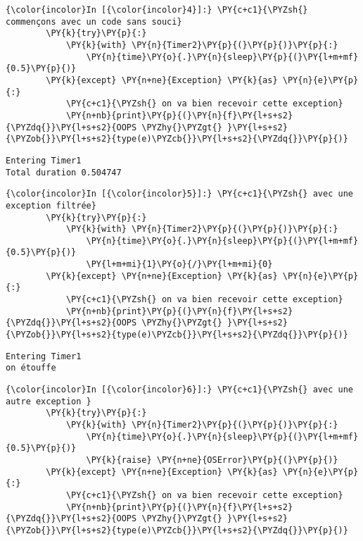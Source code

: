     \begin{Verbatim}[commandchars=\\\{\}]
{\color{incolor}In [{\color{incolor}4}]:} \PY{c+c1}{\PYZsh{} commençons avec un code sans souci}
        \PY{k}{try}\PY{p}{:}
            \PY{k}{with} \PY{n}{Timer2}\PY{p}{(}\PY{p}{)}\PY{p}{:}
                \PY{n}{time}\PY{o}{.}\PY{n}{sleep}\PY{p}{(}\PY{l+m+mf}{0.5}\PY{p}{)}
        \PY{k}{except} \PY{n+ne}{Exception} \PY{k}{as} \PY{n}{e}\PY{p}{:}
            \PY{c+c1}{\PYZsh{} on va bien recevoir cette exception}
            \PY{n+nb}{print}\PY{p}{(}\PY{n}{f}\PY{l+s+s2}{\PYZdq{}}\PY{l+s+s2}{OOPS \PYZhy{}\PYZgt{} }\PY{l+s+s2}{\PYZob{}}\PY{l+s+s2}{type(e)\PYZcb{}}\PY{l+s+s2}{\PYZdq{}}\PY{p}{)}
\end{Verbatim}


    \begin{Verbatim}[commandchars=\\\{\}]
Entering Timer1
Total duration 0.504747

    \end{Verbatim}

    \begin{Verbatim}[commandchars=\\\{\}]
{\color{incolor}In [{\color{incolor}5}]:} \PY{c+c1}{\PYZsh{} avec une exception filtrée}
        \PY{k}{try}\PY{p}{:}
            \PY{k}{with} \PY{n}{Timer2}\PY{p}{(}\PY{p}{)}\PY{p}{:}
                \PY{n}{time}\PY{o}{.}\PY{n}{sleep}\PY{p}{(}\PY{l+m+mf}{0.5}\PY{p}{)}
                \PY{l+m+mi}{1}\PY{o}{/}\PY{l+m+mi}{0}
        \PY{k}{except} \PY{n+ne}{Exception} \PY{k}{as} \PY{n}{e}\PY{p}{:}
            \PY{c+c1}{\PYZsh{} on va bien recevoir cette exception}
            \PY{n+nb}{print}\PY{p}{(}\PY{n}{f}\PY{l+s+s2}{\PYZdq{}}\PY{l+s+s2}{OOPS \PYZhy{}\PYZgt{} }\PY{l+s+s2}{\PYZob{}}\PY{l+s+s2}{type(e)\PYZcb{}}\PY{l+s+s2}{\PYZdq{}}\PY{p}{)}
\end{Verbatim}


    \begin{Verbatim}[commandchars=\\\{\}]
Entering Timer1
on étouffe

    \end{Verbatim}

    \begin{Verbatim}[commandchars=\\\{\}]
{\color{incolor}In [{\color{incolor}6}]:} \PY{c+c1}{\PYZsh{} avec une autre exception }
        \PY{k}{try}\PY{p}{:}
            \PY{k}{with} \PY{n}{Timer2}\PY{p}{(}\PY{p}{)}\PY{p}{:}
                \PY{n}{time}\PY{o}{.}\PY{n}{sleep}\PY{p}{(}\PY{l+m+mf}{0.5}\PY{p}{)}
                \PY{k}{raise} \PY{n+ne}{OSError}\PY{p}{(}\PY{p}{)}
        \PY{k}{except} \PY{n+ne}{Exception} \PY{k}{as} \PY{n}{e}\PY{p}{:}
            \PY{c+c1}{\PYZsh{} on va bien recevoir cette exception}
            \PY{n+nb}{print}\PY{p}{(}\PY{n}{f}\PY{l+s+s2}{\PYZdq{}}\PY{l+s+s2}{OOPS \PYZhy{}\PYZgt{} }\PY{l+s+s2}{\PYZob{}}\PY{l+s+s2}{type(e)\PYZcb{}}\PY{l+s+s2}{\PYZdq{}}\PY{p}{)}
\end{Verbatim}


